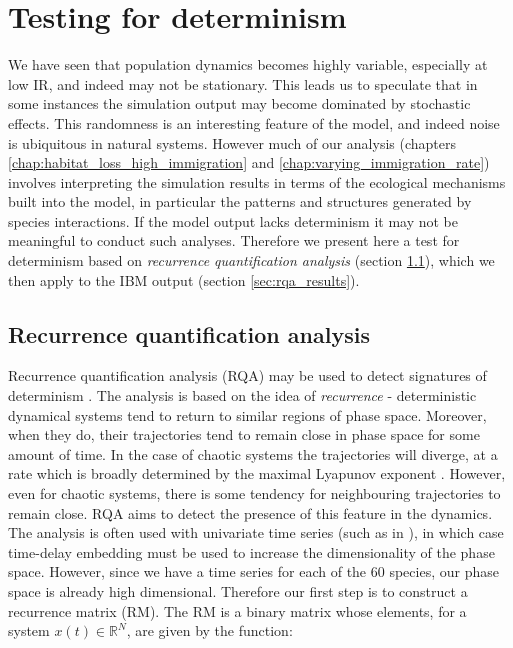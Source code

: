 \clearpage
\section{Testing for determinism}
\label{sec:determinism}


We have seen that population dynamics becomes highly variable, especially at low IR, and indeed may not be stationary. This leads us to speculate that in some instances the simulation output may become dominated by stochastic effects. This randomness is an interesting feature of the model, and indeed noise is ubiquitous in natural systems. However much of our analysis (chapters \ref{chap:habitat_loss_high_immigration} and \ref{chap:varying_immigration_rate}) involves interpreting the simulation results in terms of the ecological mechanisms built into the model, in particular the patterns and structures generated by species interactions. If the model output lacks determinism it may not be meaningful to conduct such analyses. Therefore we present here a test for determinism based on \emph{recurrence quantification analysis} (section \ref{sec:rqa}), which we then apply to the IBM output (section \ref{sec:rqa_results}).

\subsection{Recurrence quantification analysis}
\label{sec:rqa}      

Recurrence quantification analysis (RQA) may be used to detect signatures of determinism \cite{marwan2007recurrence,aparicio2008detecting,saul09phd}. The analysis is based on the idea of \emph{recurrence} - deterministic dynamical systems tend to return to similar regions of phase space. Moreover, when they do, their trajectories tend to remain close in phase space for some amount of time. In the case of chaotic systems the trajectories will diverge, at a rate which is broadly determined by the maximal Lyapunov exponent \cite{saul09phd}. However, even for chaotic systems, there is some tendency for neighbouring trajectories to remain close. RQA aims to detect the presence of this feature in the dynamics. The analysis is often used with univariate time series (such as in \cite{saul09phd}), in which case time-delay embedding must be used to increase the dimensionality of the phase space. However, since we have a time series for each of the 60 species, our phase space is already high dimensional. Therefore our first step is to construct a recurrence matrix (RM). The RM is a binary matrix whose elements, for a system $x(t) \in \mathbb{R}^N$, are given by the function:

